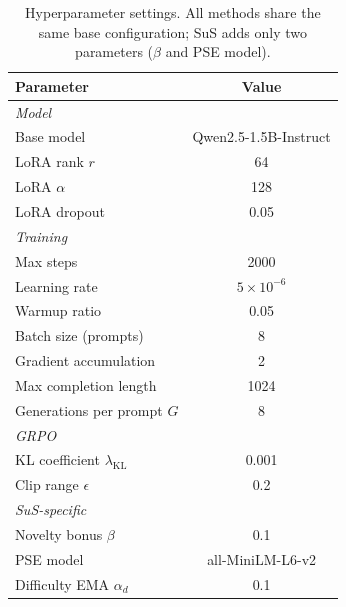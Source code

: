 \begin{table}[h]
\centering
\small
\caption{Hyperparameter settings. All methods share the same base configuration; SuS adds only two parameters ($\beta$ and PSE model).}
\label{tab:hyperparameters}
\begin{tabular}{@{}lc@{}}
\toprule
Parameter & Value \\
\midrule
\textit{Model} & \\
Base model & Qwen2.5-1.5B-Instruct \\
LoRA rank $r$ & 64 \\
LoRA $\alpha$ & 128 \\
LoRA dropout & 0.05 \\
\midrule
\textit{Training} & \\
Max steps & 2000 \\
Learning rate & $5 \times 10^{-6}$ \\
Warmup ratio & 0.05 \\
Batch size (prompts) & 8 \\
Gradient accumulation & 2 \\
Max completion length & 1024 \\
Generations per prompt $G$ & 8 \\
\midrule
\textit{GRPO} & \\
KL coefficient $\lambda_{\text{KL}}$ & 0.001 \\
Clip range $\epsilon$ & 0.2 \\
\midrule
\textit{SuS-specific} & \\
Novelty bonus $\beta$ & 0.1 \\
PSE model & all-MiniLM-L6-v2 \\
Difficulty EMA $\alpha_d$ & 0.1 \\
\bottomrule
\end{tabular}
\end{table}
